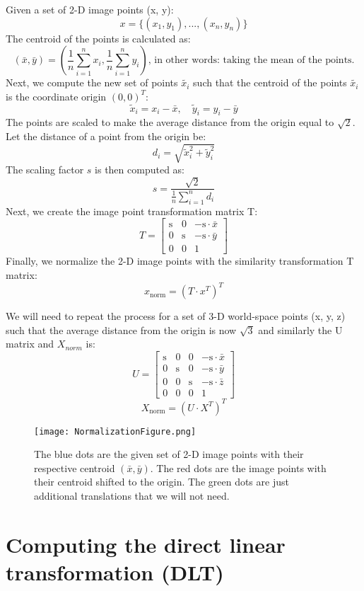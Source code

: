 \documentclass[12pt]{article}
\begin{document}
\noindent Given a set of 2-D image points (x, y):
\[
    x = \{(x_1, y_1), ..., (x_n, y_n)\}
\]
The centroid of the points is calculated as:
\[
        (\bar{x}, \bar{y}) = ( \frac{1}{n}\sum_{i=1}^{n} x_i,  \frac{1}{n}\sum_{i=1}^{n} y_i)
        \text{, in other words: taking the mean of the points.}
\]
Next, we compute the new set of points \( \tilde{x_i} \) such that the centroid of the points \( \tilde{x_i} \) is the coordinate origin \( (0, 0)^T \):
\[
    \tilde{x}_i = x_i - \bar{x}, \quad \tilde{y}_i = y_i - \bar{y}
\]
The points are scaled to make the average distance from the origin equal to \( \sqrt{2} \). Let the distance of a point from the origin be:
\[
    d_i = \sqrt{\tilde{x}_i^2 + \tilde{y}_i^2}
\]
The scaling factor \( s \) is then computed as:
\[
    s = \frac{\sqrt{2}}{\frac{1}{n} \sum_{i=1}^{n} d_i}
\]
Next, we create the image point transformation matrix T:
\[
T = \begin{bmatrix}
\text{s} & 0 & -\text{s} \cdot \bar{x} \\
0 & \text{s} & -\text{s} \cdot \bar{y} \\
0 & 0 & 1
\end{bmatrix}
\]
Finally, we normalize the 2-D image points with the similarity transformation T matrix:
\[
x_{\text{norm}} = (T \cdot x^T)^T
\]

\noindent We will need to repeat the process for a set of 3-D world-space points (x, y, z) such that the average distance from the origin is now \( \sqrt{3} \) and similarly the U matrix and \( X_{norm} \) is:
\[
U = \begin{bmatrix}
\text{s} & 0 & 0 & -\text{s} \cdot \bar{x} \\
0 & \text{s} & 0 & -\text{s} \cdot \bar{y} \\
0 & 0 & \text{s} & -\text{s} \cdot \bar{z} \\
0 & 0 & 0 & 1
\end{bmatrix}
\]
\[
X_{\text{norm}} = (U \cdot X^T)^T
\]
\newpage

\begin{figure}[ht]
    \centering
    \texttt{[image: NormalizationFigure.png]}
    \caption{The blue dots are the given set of 2-D image points with their respective centroid \( (\bar{x}, \bar{y}) \). The red dots are the image points with their centroid shifted to the origin. The green dots are just additional translations that we will not need. }
\end{figure}

\section{Computing the direct linear transformation (DLT)}
\end{document}
